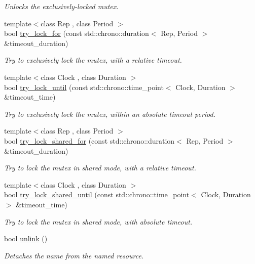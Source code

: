 \begin{DoxyCompactItemize}
\begin{DoxyCompactList}\small\item\em Unlocks the exclusively-\/locked mutex. \end{DoxyCompactList}\item 
{\footnotesize template$<$class Rep , class Period $>$ }\\bool \hyperlink{classcpen333_1_1process_1_1impl_1_1shared__mutex__shared_a4437c703911edfa03d9cc759fbc6f9c3}{try\+\_\+lock\+\_\+for} (const std\+::chrono\+::duration$<$ Rep, Period $>$ \&timeout\+\_\+duration)
\begin{DoxyCompactList}\small\item\em Try to exclusively lock the mutex, with a relative timeout. \end{DoxyCompactList}\item 
{\footnotesize template$<$class Clock , class Duration $>$ }\\bool \hyperlink{classcpen333_1_1process_1_1impl_1_1shared__mutex__shared_a3aeb0499325e4a073de1877f0a41f2bb}{try\+\_\+lock\+\_\+until} (const std\+::chrono\+::time\+\_\+point$<$ Clock, Duration $>$ \&timeout\+\_\+time)
\begin{DoxyCompactList}\small\item\em Try to exclusively lock the mutex, within an absolute timeout period. \end{DoxyCompactList}\item 
{\footnotesize template$<$class Rep , class Period $>$ }\\bool \hyperlink{classcpen333_1_1process_1_1impl_1_1shared__mutex__shared_a14203d4013d62fed7e1a8904c0db3793}{try\+\_\+lock\+\_\+shared\+\_\+for} (const std\+::chrono\+::duration$<$ Rep, Period $>$ \&timeout\+\_\+duration)
\begin{DoxyCompactList}\small\item\em Try to lock the mutex in shared mode, with a relative timeout. \end{DoxyCompactList}\item 
{\footnotesize template$<$class Clock , class Duration $>$ }\\bool \hyperlink{classcpen333_1_1process_1_1impl_1_1shared__mutex__shared_a25bf54e2064e78bc18e996dacb082f3c}{try\+\_\+lock\+\_\+shared\+\_\+until} (const std\+::chrono\+::time\+\_\+point$<$ Clock, Duration $>$ \&timeout\+\_\+time)
\begin{DoxyCompactList}\small\item\em Try to lock the mutex in shared mode, with absolute timeout. \end{DoxyCompactList}\item 
bool \hyperlink{classcpen333_1_1process_1_1impl_1_1shared__mutex__shared_a8e6c759f5d5266b931ed78da04652d61}{unlink} ()
\begin{DoxyCompactList}\small\item\em Detaches the name from the named resource. \end{DoxyCompactList}\end{DoxyCompactItemize}
